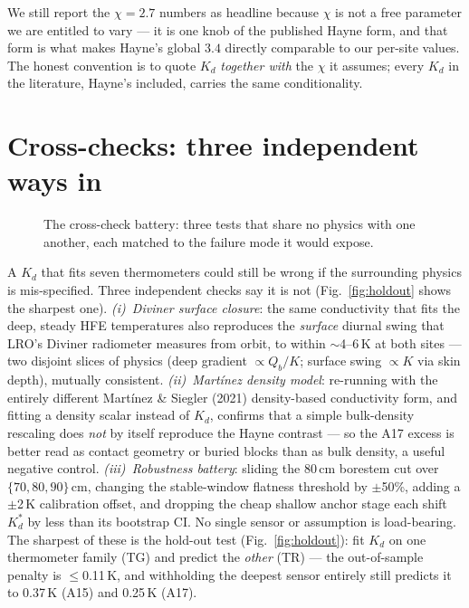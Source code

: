 \documentclass[11pt]{report}
\begin{document}
\noindent We still report the $\chi=2.7$ numbers as headline because $\chi$ is
not a free parameter we are entitled to vary --- it is one knob of the published
Hayne form, and that form is what makes Hayne's global $3.4$ directly comparable
to our per-site values. The honest convention is to quote $K_d$ \emph{together
with} the $\chi$ it assumes; every $K_d$ in the literature, Hayne's included,
carries the same conditionality.

\section{Cross-checks: three independent ways in}

\begin{figure}[htbp]\centering

\caption{The cross-check battery: three tests that share no physics with
one another, each matched to the failure mode it would expose.}
\label{fig:crosschecks}
\end{figure}
\label{sec:crosschecks}

A $K_d$ that fits seven thermometers could still be wrong if the surrounding
physics is mis-specified. Three independent checks say it is not
(Fig.~\ref{fig:holdout} shows the sharpest one).
\emph{(i)~Diviner surface closure}: the same conductivity that fits the deep,
steady HFE temperatures also reproduces the \emph{surface} diurnal swing that
LRO's Diviner radiometer measures from orbit, to within $\sim$4--6\,K at both
sites --- two disjoint slices of physics (deep gradient $\propto Q_b/K$; surface
swing $\propto K$ via skin depth), mutually consistent. \emph{(ii)~Martínez
density model}: re-running with the entirely different Martínez \& Siegler (2021)
density-based conductivity form, and fitting a density scalar instead of $K_d$,
confirms that a simple bulk-density rescaling does \emph{not} by itself reproduce
the Hayne contrast --- so the A17 excess is better read as contact geometry or
buried blocks than as bulk density, a useful negative control. \emph{(iii)~Robustness
battery}: sliding the 80\,cm borestem cut over $\{70,80,90\}$\,cm, changing the
stable-window flatness threshold by $\pm$50\%, adding a $\pm$2\,K calibration
offset, and dropping the cheap shallow anchor stage each shift $K_d^{*}$ by less
than its bootstrap CI. No single sensor or assumption is load-bearing.
The sharpest of these is the hold-out test (Fig.~\ref{fig:holdout}): fit
$K_d$ on one thermometer family (TG) and predict the \emph{other} (TR) ---
the out-of-sample penalty is $\le$0.11\,K, and withholding the deepest
sensor entirely still predicts it to 0.37\,K (A15) and 0.25\,K (A17).
\end{document}

